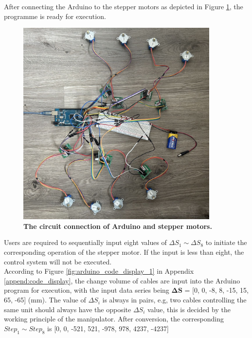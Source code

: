 \vspace{-15mm}
After connecting the Arduino to the stepper motors as depicted in Figure \ref{fig:circuit_connection}, 
the programme is ready for execution.
\begin{figure}[H] %
    \centering 
    \captionsetup{labelsep=colon}
    \includegraphics[width=0.9\textwidth]{Image/Result/circuit_connection.jpg} 
    \caption[The circuit connection of Arduino and stepper motors]
    {\centering \textbf{The circuit connection of Arduino and stepper motors.}}
    \label{fig:circuit_connection}
\end{figure}
\vspace{-5mm}
\noindent Users are required to sequentially input eight values of $\Delta S_1 \sim \Delta S_8$ to initiate 
the corresponding operation of the stepper motor. If the input is less than eight, the control system will 
not be executed. \\
According to Figure \ref{fig:arduino_code_display_1} in Appendix \ref{append:code_display}, the change volume 
of cables are input into the Arduino program for execution, with the input data series being $\boldsymbol{\Delta S}$ 
= [0, 0, -8, 8, -15, 15, 65, -65] (mm). The value of $\Delta S_i$ is always in pairs, e.g, two cables controlling 
the same unit should always have the opposite $\Delta S_i$ value, this is decided by the working principle of the 
manipulator. After conversion, the corresponding $Step_1 \sim Step_8$ is [0, 0, -521, 521, -978, 978, 4237, -4237] 
